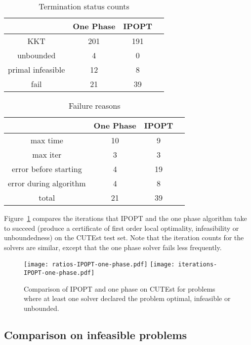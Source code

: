 \documentclass{article}
\begin{document}

\begin{table}[H]
\caption{Termination status counts}\label{tbl:termination-status-counts}
\begin{tabular}{ c c c r }
 &  One Phase &  IPOPT &  \\
  \hline
KKT &  201 & 191 \\
unbounded & 4 & 0  \\
primal infeasible & 12 &  8 \\
fail & 21 & 39 \\
\end{tabular}
\end{table}

\begin{table}[H]
\caption{Failure reasons}\label{tbl:failure-reasons}
\begin{tabular}{ c c c r }
 &  One Phase & IPOPT \\
  \hline
max time & 10 & 9  \\
max iter &  3 & 3 \\
error before starting & 4 & 19 \\
error during algorithm & 4 & 8 \\
\hline
total & 21 & 39
\end{tabular}
\end{table}

Figure~\ref{fig:comparison-IPOPT-on-CUTEst} compares the iterations that IPOPT and the one phase algorithm take to succeed (produce a certificate of first order local optimality, infeasibility or unboundedness) on the CUTEst test set. Note that the iteration counts for the solvers are similar, except that the one phase solver fails less frequently.


\begin{figure}[H]
\texttt{[image: ratios-IPOPT-one-phase.pdf]}
\texttt{[image: iterations-IPOPT-one-phase.pdf]}
\caption{Comparison of IPOPT and one phase on CUTEst for problems where at least one solver declared the problem optimal, infeasible or unbounded.}\label{fig:comparison-IPOPT-on-CUTEst}
\end{figure}


\subsection{Comparison on infeasible problems}\label{sec:infeas}
\end{document}
